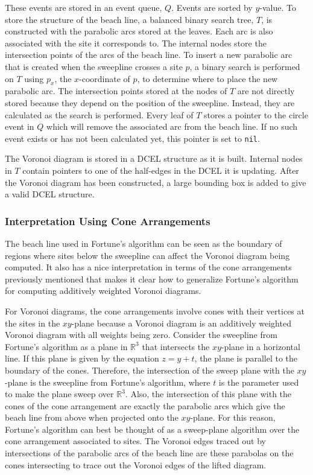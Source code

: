 \documentclass[a4paper, 11pt]{article}
\newcommand{\R}{\mathbb{R}}
\begin{document}
These events are stored in an event queue, $Q$. Events are sorted by $y$-value. To store the structure of the beach line, a balanced binary search
tree, $T$, is constructed with the parabolic arcs stored at the leaves. Each arc is also associated with the
site it corresponds to. The internal nodes store the intersection points of the arcs of the beach line. To insert a new parabolic arc that is created
when the sweepline crosses a site $p$, a binary search is performed on $T$ using $p_x$, the $x$-coordinate of $p$, to determine where to place the new
parabolic arc. The intersection points stored at the nodes of $T$ are not directly stored because they depend on the position of the sweepline.
Instead, they are calculated as the search is performed. Every leaf of $T$ stores a pointer to the circle event in $Q$ which will remove the
associated arc from the beach line. If no such event exists or has not been calculated yet, this pointer is set to \texttt{nil}.

The Voronoi diagram is stored in a DCEL structure as it is built. Internal nodes in $T$ contain pointers to one of the half-edges in the DCEL it is
updating. After the Voronoi diagram has been constructed, a large bounding box is added to give a valid DCEL structure.

\subsubsection{Interpretation Using Cone Arrangements}

The beach line used in Fortune's algorithm can be seen as the boundary of regions where sites below the sweepline can affect the Voronoi diagram being
computed. It also has a nice interpretation in terms of the cone arrangements previously mentioned that makes it clear how to generalize Fortune's
algorithm for computing additively weighted Voronoi diagrams.

For Voronoi diagrams, the cone arrangements involve cones with their vertices at the sites in the $xy$-plane because a Voronoi diagram is an
additively weighted Voronoi diagram with all weights being zero. Consider the sweepline from Fortune's algorithm as a plane in $\R^3$ that intersects
the $xy$-plane in a horizontal line. If this plane is given by the equation $z = y + t$, the plane is parallel to the boundary of the cones.
Therefore, the intersection of the sweep plane with the $xy$-plane is the sweepline from
Fortune's algorithm, where $t$ is the parameter used to make the plane sweep over $\R^3$. Also, the intersection of this plane with the cones of the
cone arrangement are exactly the parabolic arcs which give the beach line from above when projected onto the $xy$-plane. For this reason, Fortune's algorithm can best be thought of as a sweep-plane
algorithm over the cone arrangement associated to sites. The Voronoi edges traced out by intersections of the parabolic arcs of the beach line are
these parabolas on the cones intersecting to trace out the Voronoi edges of the lifted diagram.
\end{document}
